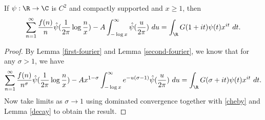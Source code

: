 \begin{lemma}
\label{limiting}
\leanok
If $\psi: \R \to \C$ is $C^2$ and compactly supported and $x \geq 1$, then
  $$ \sum_{n=1}^\infty \frac{f(n)}{n} \hat \psi( \frac{1}{2\pi} \log \frac{n}{x} )
    - A \int_{-\log x}^\infty \hat \psi(\frac{u}{2\pi})\ du
    = \int_\R G(1+it) \psi(t) x^{it}\ dt.$$
\end{lemma}
\begin{proof}
\leanok
By Lemma \ref{first-fourier} and Lemma \ref{second-fourier}, we know that for any $\sigma>1$,
  we have
  $$ \sum_{n=1}^\infty \frac{f(n)}{n^\sigma} \hat \psi( \frac{1}{2\pi} \log \frac{n}{x} )
    - A x^{1-\sigma} \int_{-\log x}^\infty e^{-u(\sigma-1)} \hat \psi(\frac{u}{2\pi})\ du
    = \int_\R G(\sigma+it) \psi(t) x^{it}\ dt.$$
  Now take limits as $\sigma \to 1$ using dominated convergence together with \eqref{cheby}
  and Lemma \ref{decay} to obtain the result.
\end{proof}
